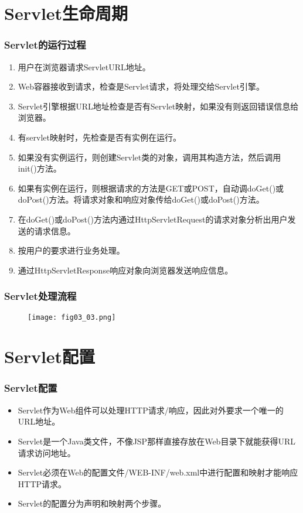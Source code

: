 \section{Servlet生命周期}

\begin{frame}[fragile] %
\frametitle{Servlet的运行过程} 
\begin{enumerate}\kai
\item 用户在浏览器请求ServletURL地址。
\item Web容器接收到请求，检查是Servlet请求，将处理交给Servlet引擎。
\item Servlet引擎根据URL地址检查是否有Servlet映射，如果没有则返回错误信息给浏览器。
\item 有servlet映射时，先检查是否有实例在运行。
\item 如果没有实例运行，则创建Servlet类的对象，调用其构造方法，然后调用init()方法。
\item 如果有实例在运行，则根据请求的方法是GET或POST，自动调doGet()或doPost()方法。将请求对象和响应对象传给doGet()或doPost()方法。
\item 在doGet()或doPost()方法内通过HttpServletRequest的请求对象分析出用户发送的请求信息。
\item 按用户的要求进行业务处理。
\item 通过HttpServletResponse响应对象向浏览器发送响应信息。
\end{enumerate}
\end{frame}

\begin{frame}[fragile] %
\frametitle{Servlet处理流程} 
\begin{figure}
\centering
\texttt{[image: fig03\_03.png]}
\end{figure}
\end{frame}

\section{Servlet配置}

\begin{frame}[fragile] %
\frametitle{Servlet配置}
\begin{itemize}
\item Servlet作为Web组件可以处理HTTP请求/响应，因此对外要求一个唯一的URL地址。
\item Servlet是一个Java类文件，不像JSP那样直接存放在Web目录下就能获得URL请求访问地址。
\item Servlet必须在Web的配置文件{\Red /WEB-INF/web.xml}中进行配置和映射才能响应HTTP请求。
\item Servlet的配置分为{\hei 声明和映射}两个步骤。
\end{itemize}
\end{frame}


